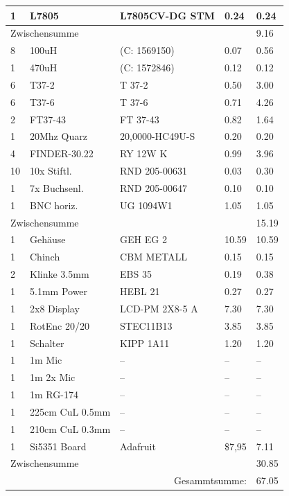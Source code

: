 \documentclass[10pt, a4paper]{paper}
\begin{document}
\begin{longtable}{|p{}|p{}|p{}|p{}|p{}|}
 1 & L7805        & L7805CV-DG STM  & 0.24  & 0.24 \\ \hline
 \multicolumn{4}{|l|}{Zwischensumme}        & 9.16 \\ \hline
 8 & 100uH        & (C: 1569150)    & 0.07  & 0.56 \\
 1 & 470uH        & (C: 1572846)    & 0.12  & 0.12 \\
 6 & T37-2        & T 37-2          & 0.50  & 3.00 \\
 6 & T37-6        & T 37-6          & 0.71  & 4.26 \\
 2 & FT37-43      & FT 37-43        & 0.82  & 1.64 \\
 1 & 20Mhz Quarz  & 20,0000-HC49U-S & 0.20  & 0.20 \\ 
 4 & FINDER-30.22 & RY 12W K        & 0.99  & 3.96 \\ 
10 & 10x Stiftl.  & RND 205-00631   & 0.03  & 0.30 \\
 1 & 7x Buchsenl. & RND 205-00647   & 0.10  & 0.10 \\
 1 & BNC horiz.   & UG 1094W1       & 1.05  & 1.05 \\ \hline
 \multicolumn{4}{|l|}{Zwischensumme}        & 15.19 \\ \hline
 1 & Gehäuse      & GEH EG 2        & 10.59 & 10.59 \\
 1 & Chinch       & CBM METALL      & 0.15  & 0.15 \\ 
 2 & Klinke 3.5mm & EBS 35          & 0.19  & 0.38 \\
 1 & 5.1mm Power  & HEBL 21         & 0.27  & 0.27 \\
 1 & 2x8 Display  & LCD-PM 2X8-5 A  & 7.30  & 7.30 \\ 
 1 & RotEnc 20/20 & STEC11B13       & 3.85  & 3.85 \\
 1 & Schalter     & KIPP 1A11       & 1.20  & 1.20 \\
 1 & 1m Mic       & -- & -- & -- \\
 1 & 1m 2x Mic    & -- & -- & -- \\
 1 & 1m RG-174    & -- & -- & -- \\ 
 1 & 225cm CuL 0.5mm & -- & -- & -- \\
 1 & 210cm CuL 0.3mm & -- & -- & -- \\
 1 & Si5351 Board & Adafruit & \$7,95 & 7.11 \\\hline 
 \multicolumn{4}{|l|}{Zwischensumme}        & 30.85 \\ \hline \hline
 \multicolumn{4}{|r|}{Gesammtsumme:}        & 67.05 \\ \hline
\end{longtable}









\end{document}

